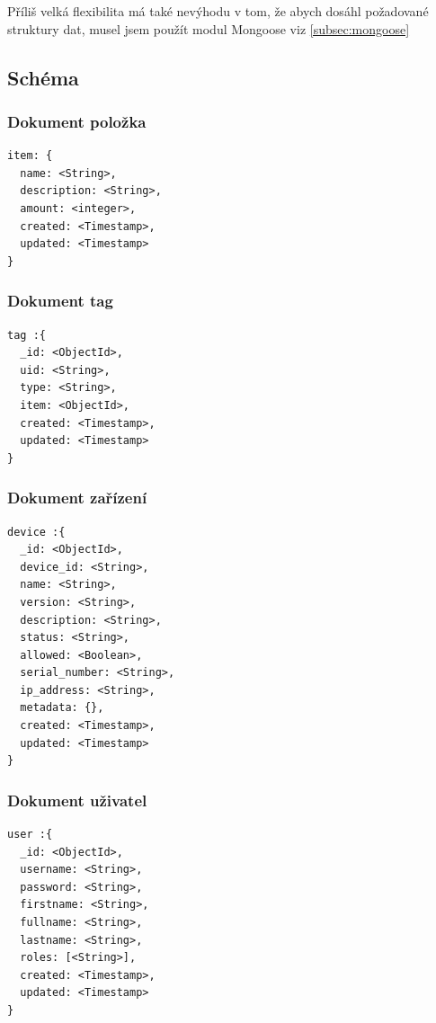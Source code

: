 \documentclass[czech,BP]{thesiskiv}
\begin{document}
Příliš velká flexibilita má také nevýhodu v tom, že abych dosáhl požadované struktury dat, musel jsem použít modul Mongoose viz \ref{subsec:mongoose}



		
		\subsection{Schéma}
	

	
	\subsubsection*{Dokument položka}
	
\begin{verbatim}
item: {
  name: <String>,
  description: <String>,
  amount: <integer>,
  created: <Timestamp>,
  updated: <Timestamp>
}
\end{verbatim} 

\subsubsection*{Dokument tag}

\begin{verbatim}
tag :{
  _id: <ObjectId>,
  uid: <String>,
  type: <String>,
  item: <ObjectId>,
  created: <Timestamp>,
  updated: <Timestamp>
}
\end{verbatim} 


\subsubsection*{Dokument zařízení}


\begin{verbatim}
device :{
  _id: <ObjectId>,
  device_id: <String>,
  name: <String>,
  version: <String>,
  description: <String>,
  status: <String>,
  allowed: <Boolean>,
  serial_number: <String>,
  ip_address: <String>,
  metadata: {},
  created: <Timestamp>,
  updated: <Timestamp>
}
\end{verbatim}
	
\subsubsection*{Dokument uživatel}

\begin{verbatim}
user :{
  _id: <ObjectId>,
  username: <String>,
  password: <String>,
  firstname: <String>,
  fullname: <String>,
  lastname: <String>,
  roles: [<String>],
  created: <Timestamp>,
  updated: <Timestamp>
}
\end{verbatim}
\end{document}
